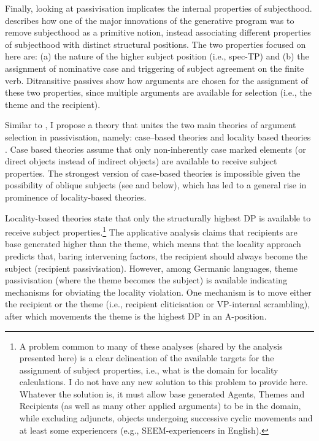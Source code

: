 Finally, looking at passivisation implicates the internal properties of subjecthood. \cite{McCloskey.1997} describes how one of the major innovations of the generative program was to remove subjecthood as a primitive notion, instead associating different properties of subjecthood with distinct structural positions. The two properties focused on here are: (a) the nature of the higher subject position (i.e., spec-TP) and (b) the assignment of nominative case and triggering of subject agreement on the finite verb. Ditransitive passives show how arguments are chosen for the assignment of these two properties, since multiple arguments are available for selection (i.e., the theme and the recipient).

Similar to \cite{Platzack.2005}, I propose a theory that unites the two main theories of argument selection in passivisation, namely: case--based theories \citep{Larson.1988,Baker.1988,Pesetsky.1996,Holmberg.2001} and locality based theories \citep{Falk.1990,Holmberg.1995,McGinnis.1998,Anagnostopoulou.2003}.  Case based theories assume that only non-inherently case marked elements (or direct objects instead of indirect objects) are available to receive subject properties. The strongest version of case-based theories is impossible given the possibility of oblique subjects (see \citealt{Zaenen.1985} and below), which has led to a general rise in prominence of locality-based theories.

Locality-based theories state that only the structurally highest DP is available to receive subject properties.\footnote{A problem common to many of these analyses (shared by the analysis presented here) is a clear delineation of the available targets for the assignment of subject properties, i.e., what is the domain for locality calculations. I do not have any new solution to this problem to provide here. Whatever the solution is, it must allow base generated Agents, Themes and Recipients (as well as many other applied arguments) to be in the domain, while excluding adjuncts, objects undergoing successive cyclic movements and at least some experiencers (e.g., SEEM-experiencers in English).} The applicative analysis claims that recipients are base generated higher than the theme, which means that the locality approach predicts that, baring intervening factors, the recipient should always become the subject (recipient passivisation). However, among Germanic languages, theme passivisation (where the theme becomes the subject) is available indicating mechanisms for obviating the locality violation. One mechanism is to move either the recipient or the theme (i.e., recipient cliticisation or VP-internal scrambling), after which movements the theme is the highest DP in an A-position.

